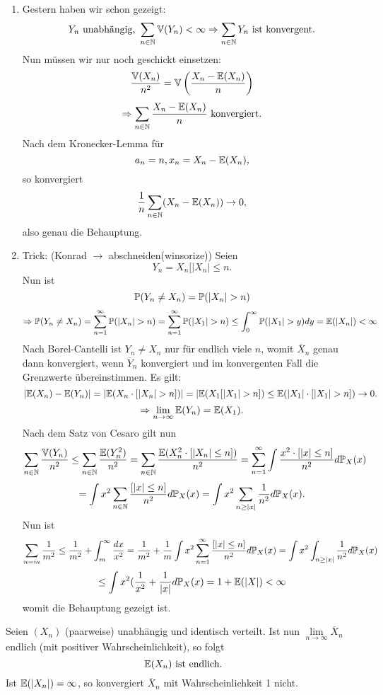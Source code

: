 			\begin{bew}
				$ $
				\begin{enumerate}[(1)]
					\item Gestern haben wir schon gezeigt:
						\[ Y_n\text{ unabhängig, }\sum_{n\in\N}\V(Y_n)<\infty\Rightarrow\sum_{n\in\N} Y_n\text{ ist konvergent}. \]
						Nun müssen wir nur noch geschickt einsetzen: 
						\[ \frac{\V(X_n)}{n^2}=\V\left(\frac{X_n-\E(X_n)}{n}\right) \]
						\[ \Rightarrow \sum_{n\in\N} \frac{X_n-\E(X_n)}{n}\text{ konvergiert.} \]
						Nach dem Kronecker-Lemma für 
						\[ a_n=n, x_n=X_n-\E(X_n), \]
						so konvergiert
						\[ \frac{1}{n}\sum_{n\in\N} (X_n-\E(X_n))\to 0, \]
						also genau die Behauptung. 
					\item Trick: (Konrad $\to$ abschneiden(winsorize))\newline
						Seien 
						\[ Y_n=X_n[|X_n|\le n. \]
						Nun ist
						\[ \P(Y_n\neq X_n)=\P(|X_n|>n) \]
						\[ \Rightarrow \P(Y_n\neq X_n)=\sum_{n=1}^\infty \P(|X_n|>n)=\sum_{n=1}^\infty\P(|X_1|>n)\le \int_0^\infty\P(|X_1|>y)dy=\E(|X_n|)<\infty \]
						Nach Borel-Cantelli ist $Y_n\neq X_n$ nur für endlich viele $n$, womit $\overline{X}_n$ genau dann konvergiert, wenn $\overline{Y}_n$ konvergiert und im konvergenten Fall die Grenzwerte übereinstimmen.\newline
						Es gilt:
						\[ |\E(X_n)-\E(Y_n)|=|\E(X_n\cdot[|X_n|>n])|=|\E(X_1[|X_1|>n])\le\E(|X_1|\cdot[|X_1|>n])\to 0.  \]
						\[ \Rightarrow \lim_{n\to\infty}\E(Y_n)=\E(X_1). \]
						Nach dem Satz von Cesaro gilt nun
						\[ \sum_{n\in \N} \frac{\V(Y_n)}{n^2}\le \sum_{n\in\N}\frac{\E(Y_n^2)}{n^2}=\sum_{n\in\N}\frac{\E(X_n^2\cdot[|X_n|\le n])}{n^2}=\sum_{n=1}^\infty\int \frac{x^2\cdot[|x|\le n]}{n^2}d\P_X(x) \]
						\[ =\int x^2\sum_{n\in\N}\frac{[|x|\le n]}{n^2}d\P_X(x)=\int x^2\sum_{n\ge |x|} \frac{1}{n^2}d\P_X(x). \]
						Nun ist
						\[ \sum_{n=m}\frac{1}{m^2}\le \frac{1}{m^2}+\int_m^\infty\frac{dx}{x^2}=\frac{1}{m^2}+\frac{1}{m}\int x^2\sum_{n=1}^\infty\frac{[|x|\le n]}{n^2}d\P_X(x)=\int x^2\int_{n\ge|x|}\frac{1}{n^2}d\P_X(x)\]
						\[\le \int x^2(\frac{1}{x^2}+\frac{1}{|x|}d\P_X(x)=1+\E(|X|)<\infty \]
						womit die Behauptung gezeigt ist. 
				\end{enumerate}
			\end{bew}
			
			\begin{satz}
				Seien $(X_n)$ (paarweise) unabhängig und identisch verteilt. Ist nun $\lim\limits_{n\to\infty}\overline{X}_n$ endlich (mit positiver Wahrscheinlichkeit), so folgt
				\[ \E(X_n)\text{ ist endlich.} \]
				Ist $\E(|X_n|)=\infty$, so konvergiert $\overline{X}_n$ mit Wahrscheinlichkeit 1 nicht.
			\end{satz}
			
